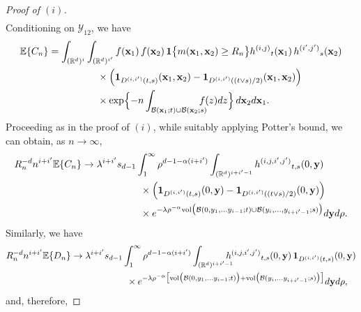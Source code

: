 \documentclass[11pt]{amsart}
\numberwithin{equation}{section}
\theoremstyle{plain}
\theoremstyle{definition}
\begin{document}
\begin{proof}[Proof of $(i)$]
\begin{align*}
\end{align*}
Conditioning on ${{\mathcal{Y}}}_{12}$, we have
\begin{align*}
{\mathbb{E}} \{ C_n\} &= \int_{({{\mathbb R}}^d)^i}\int_{({{\mathbb R}}^d)^{i^{\prime}}} f({{\bf x}}_1)\,f({{\bf x}}_2)\, {{\bf 1}} \bigl\{ m({{\bf x}}_1,{{\bf x}}_2) \geq R_n \bigr\} {h^{(i,j)}}_t({{\bf x}}_1)\,{h^{({i^{\prime}},{j^{\prime}})}}_s({{\bf x}}_2) \\
&\qquad \qquad \quad \times \Bigl( {{\bf 1}}_{{D^{(i,{i^{\prime}})}}(t,s)}({{\bf x}}_1,{{\bf x}}_2) - {{\bf 1}}_{{D^{(i,{i^{\prime}})}}((t\vee s)/2)}({{\bf x}}_1,{{\bf x}}_2) \Bigr) \\
&\qquad \qquad \quad \times  \exp \Bigl\{ -n\int_{{\mathcal B}({{\bf x}}_1; t) \cup {\mathcal B}({{\bf x}}_2; s)} \hspace{-10pt}f(z)dz \Bigr\}\, d{{\bf x}}_2 d{{\bf x}}_1.
\end{align*}
Proceeding as in the proof of $(i)$, while suitably applying Potter's bound, we can obtain, as $n\to\infty$,
\begin{align*}
R_n^{-d} n^{i + {i^{\prime}}} {\mathbb{E}} \{ C_n\}  &\to \lambda^{i+{i^{\prime}}}  s_{d-1} \int_1^\infty \rho^{d-1-\alpha(i+{i^{\prime}})} \int_{({{\mathbb R}}^d)^{i+{i^{\prime}}-1}} {h^{(i, j, i^{\prime}, j^{\prime})}}_{t,s}(0,{{\bf y}}) \\
&\qquad \qquad \qquad \times \Bigl( {{\bf 1}}_{{D^{(i,{i^{\prime}})}}(t,s)}(0,{{\bf y}}) - {{\bf 1}}_{{D^{(i,{i^{\prime}})}}((t\vee s)/2)}(0,{{\bf y}}) \Bigr) \\
&\qquad \qquad \qquad \times e^{-\lambda \rho^{-\alpha} \text{vol} \bigl( {\mathcal B}(0,y_1,\dots y_{i-1}; t) \cup {\mathcal B} (y_i, \dots, y_{i+{i^{\prime}}-1}; s) \bigr)} d{{\bf y}} d\rho.
\end{align*}
Similarly, we have
\begin{align*}
R_n^{-d} n^{i + {i^{\prime}}} {\mathbb{E}} \{ D_n\}  &\to  \lambda^{i+{i^{\prime}}} s_{d-1} \int_1^\infty \rho^{d-1-\alpha(i+{i^{\prime}})} \int_{({{\mathbb R}}^d)^{i+{i^{\prime}}-1}} \hspace{-10pt} {h^{(i, j, i^{\prime}, j^{\prime})}}_{t,s}(0,{{\bf y}})\, {{\bf 1}}_{{D^{(i,{i^{\prime}})}}(t,s)}(0,{{\bf y}}) \\
&\qquad \qquad \qquad \times e^{-\lambda \rho^{-\alpha} \bigl[ \text{vol}\bigl({\mathcal B}(0,y_1,\dots y_{i-1}; t)\bigr) +  \text{vol}\bigl({\mathcal B}(y_i,\dots y_{i+{i^{\prime}}-1}; s)\bigr) \bigr]  } d{{\bf y}} d\rho,
\end{align*}
and, therefore,

\end{proof}
\end{document}

